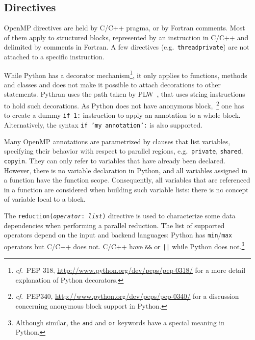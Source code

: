 \documentclass{sigplanconf}
\newcommand\see{\emph{cf.\ }}
\begin{document}
\subsection{Directives}

OpenMP directives are held by C/C++ pragma, or by Fortran comments. Most of them
apply to structured blocks, represented by an instruction in C/C++ and delimited
by comments in Fortran. A few directives (e.g.\ \texttt{threadprivate}) are not
attached to a specific instruction.

While Python has a decorator mechanism\footnote{\see PEP 318,
\url{http://www.python.org/dev/peps/pep-0318/} for a more detail explanation of
Python decorators.}, it only applies to functions, methods and classes and does
not make it possible to attach decorations to other statements. Pythran uses the
path taken by PLW~\cite{dongara2007}, that uses string instructions to hold such
decorations. As Python does not have anonymous block,~\footnote{\see PEP340,
    \url{http://www.python.org/dev/peps/pep-0340/} for a discussion concerning
anonymous block support in Python.} one has to create a dummy \texttt{if 1:}
instruction to apply an annotation to a whole block. Alternatively, the syntax
\texttt{if 'my annotation':} is also supported. 

%

Many OpenMP annotations are parametrized by clauses that list variables,
specifying their behavior with respect to parallel regions, e.g.\
\texttt{private}, \texttt{shared}, \texttt{copyin}. They can only refer to
variables that have already been declared. However, there is no variable
declaration in Python, and all variables assigned in a function have the
function scope. Consequently, all variables that are referenced in a function
are considered when building such variable lists: there is no concept of
variable local to a block. %

The \texttt{reduction(\emph{operator}: \emph{list})} directive is used to
characterize some data dependencies when performing a parallel reduction. The
list of supported operators depend on the input and backend languages: Python
has \texttt{min}/\texttt{max} operators but C/C++ does not. C/C++ have
\texttt{\&\&} or \texttt{||} while Python does not.\footnote{Although similar,
the \texttt{and} and \texttt{or} keywords have a special meaning in Python.}
\end{document}
